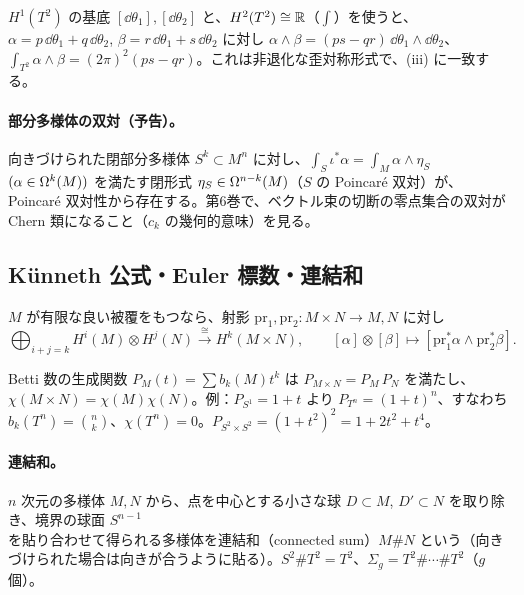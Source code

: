 \begin{ex}[$T^2$ の交叉形式]\label{B:ex:T2int}
$H^1(T^2)$ の基底 $[\dd\theta_1],[\dd\theta_2]$ と、$H^2(T^2)\cong\mathbb R$（$\int$）を使うと、$\alpha=p\,\dd\theta_1+q\,\dd\theta_2$, $\beta=r\,\dd\theta_1+s\,\dd\theta_2$ に対し
$\alpha\wedge\beta=(ps-qr)\,\dd\theta_1\wedge\dd\theta_2$、$\int_{T^2}\alpha\wedge\beta=(2\pi)^2(ps-qr)$。これは非退化な歪対称形式で、(iii) に一致する。
\end{ex}

\paragraph{部分多様体の双対（予告）。}向きづけられた閉部分多様体 $S^k\subset M^n$ に対し、$\int_S\iota^*\alpha=\int_M\alpha\wedge\eta_S$ $(\alpha\in\Omega^k(M))$ を満たす閉形式 $\eta_S\in\Omega^{n-k}(M)$（$S$ の Poincaré 双対）が、Poincaré 双対性から存在する。第6巻で、ベクトル束の切断の零点集合の双対が Chern 類になること（$c_k$ の幾何的意味）を見る。

\subsection{Künneth 公式・Euler 標数・連結和}\label{B:ss:kun}

\begin{thm}[Künneth]\label{B:thm:kunneth}\tC
$M$ が有限な良い被覆をもつなら、射影 $\mathrm{pr}_1,\mathrm{pr}_2:M\times N\to M,N$ に対し
\[
\bigoplus_{i+j=k}H^i(M)\otimes H^j(N)\xrightarrow{\ \cong\ }H^k(M\times N),\qquad[\alpha]\otimes[\beta]\mapsto[\mathrm{pr}_1^*\alpha\wedge\mathrm{pr}_2^*\beta].
\]
\end{thm}
Betti 数の生成関数 $P_M(t)=\sum b_k(M)t^k$ は $P_{M\times N}=P_M\,P_N$ を満たし、$\chi(M\times N)=\chi(M)\chi(N)$。例：$P_{S^1}=1+t$ より $P_{T^n}=(1+t)^n$、すなわち $b_k(T^n)=\binom nk$、$\chi(T^n)=0$。$P_{S^2\times S^2}=(1+t^2)^2=1+2t^2+t^4$。

\paragraph{連結和。}$n$ 次元の多様体 $M,N$ から、点を中心とする小さな球 $D\subset M$, $D'\subset N$ を取り除き、境界の球面 $S^{n-1}$ を貼り合わせて得られる多様体を連結和（connected sum）$M\#N$ という（向きづけられた場合は向きが合うように貼る）。$S^2\#T^2=T^2$、$\Sigma_g=T^2\#\cdots\#T^2$（$g$ 個）。


